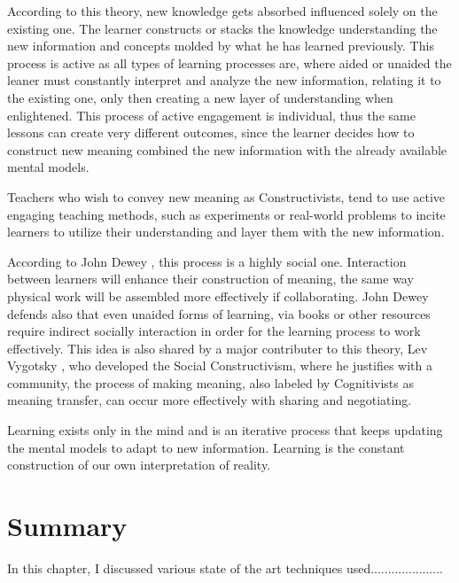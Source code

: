 According to this theory, new knowledge gets absorbed influenced solely on the 
existing one. The learner constructs or stacks the knowledge understanding the new 
information and concepts molded by what he has learned previously. This process is
active \cite{adler_1970} as all types of learning processes are, where aided or 
unaided the leaner must constantly interpret and analyze the new information,
relating it to the existing one, only then creating a new layer of understanding 
when enlightened. This process of active engagement is individual, thus the same 
lessons can create very different outcomes, since the learner decides how to construct
new meaning combined the new information with the already available mental models.

Teachers who wish to convey new meaning as Constructivists, tend to use active 
engaging teaching methods, such as experiments or real-world problems to incite
learners to utilize their understanding and layer them with the new information.

According to John Dewey \cite{dewey_1938}, this process is a highly social one. 
Interaction between learners will enhance their construction of meaning, the same
way physical work will be assembled more effectively if collaborating.
John Dewey defends also that even unaided forms of learning, via books or other 
resources require indirect socially interaction in order for the learning process 
to work effectively. This idea is also shared by a major contributer to this theory,
Lev Vygotsky \cite{vygotsky_1978}, who developed the Social Constructivism, where 
he justifies with a community, the process of making meaning, also labeled by
Cognitivists as meaning transfer, can occur more effectively with sharing and 
negotiating.

Learning exists only in the mind and is an iterative process that keeps updating the
mental models to adapt to new information. Learning is the constant construction 
of our own interpretation of reality.



\section{Summary}

In this chapter, I discussed various state of the art techniques used.....................
